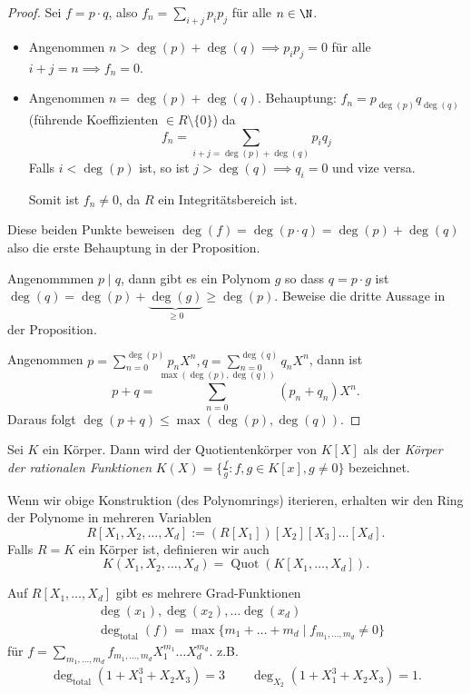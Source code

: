\begin{proof}
	Sei $f = p\cdot q$, also $f_{n} = \sum_{i+j} p_{i} p_{j} $ für alle $n \in \N$.
	\begin{itemize}
		\item Angenommen $n > \deg(p) + \deg(q) \implies p_{i} p_{j} = 0$ für alle $i+j = n \implies f_{n} = 0$.
		\item Angenommen $n = \deg(p) + \deg(q)$. Behauptung: $f_{n} = p_{\deg(p)} q_{\deg(q)}$ (führende Koeffizienten $\in R \setminus \{0\} $) da
			 \[
				 f_{n} = \sum_{i+j = \deg(p) + \deg(q)} p_{i} q_{j}
			\] 
			Falls $i < \deg(p)$ ist, so ist $j > \deg(q) \implies q_{i} = 0$ und vize versa.

			Somit ist $f_{n} \neq 0$, da $R$ ein Integritätsbereich ist.
	\end{itemize}
	Diese beiden Punkte beweisen $\deg(f) = \deg(p\cdot q) = \deg(p) + \deg(q)$ also die erste Behauptung in der Proposition.

	Angenommmen $p \mid q$, dann gibt es ein Polynom $g$ so dass $q = p \cdot g$ ist $\deg(q) = \deg(p) + \underbrace{\deg(g)}_{\geq 0} \geq \deg(p)$.
	Beweise die dritte Aussage in der Proposition.

	Angenommen $p = \sum_{n=0}^{\deg(p)} p_{n} X^{n}, q = \sum_{n=0}^{\deg(q)} q_{n} X^{n}$, dann ist
	\[
		p+q = \sum_{n=0}^{\max(\deg(p),\deg(q))} (p_{n} + q_{n}) X^{n}
	.\] 
	Daraus folgt $\deg(p+q) \leq \max(\deg(p), \deg(q))$.
\end{proof}

\begin{definition}
	Sei $K$ ein Körper. Dann wird der Quotientenkörper von $K[X]$ als der \emph{Körper der rationalen Funktionen}
	$K(X) = \{\frac{f}{g} : f,g \in K[x], g \neq 0\} $ bezeichnet.
\end{definition}

Wenn wir obige Konstruktion (des Polynomrings) iterieren, erhalten wir den Ring der Polynome in mehreren Variablen
\[
	R[X_1,X_2,\ldots,X_{d}] := (R[X_1])[X_2][X_3]\ldots[X_{d}]
.\] 
Falls $R = K$ ein Körper ist, definieren wir auch
\[
	K(X_1,X_2,\ldots,X_{d}) = \operatorname{Quot}(K[X_1,\ldots,X_{d}])
.\] 

\begin{remark}
	Auf $R[X_1,\ldots,X_{d}]$ gibt es mehrere Grad-Funktionen
	\begin{align*}
		&\deg(x_1), \deg(x_2), \ldots \deg(x_{d})\\
		&\deg_{\text{total}}(f) = \max \{m_1+\ldots+m_{d} \mid f_{m_1,\ldots,m_{d}} \neq 0\} 
	\end{align*}
	für $f = \sum_{m_1,\ldots,m_{d}} f_{m_1,\ldots,m_{d}} X_1^{m_1}\ldots X_{d}^{m_{d}}$.
	z.B.
	\begin{align*}
		\deg_{\text{total}}(1+X_1^{3} + X_2 X_3) = 3 \qquad \deg_{X_2}(1+X_1^{3} + X_2 X_3) = 1
	.\end{align*}
\end{remark}

